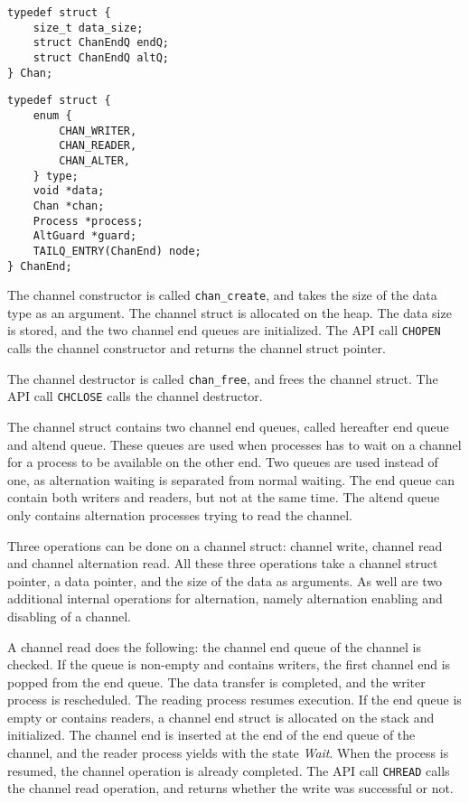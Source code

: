 \noindent\begin{minipage}{.45\textwidth}
\begin{lstlisting}[caption={Channel type struct},style={CustomC},label={lst:channel_type_struct}]
typedef struct {
    size_t data_size;
    struct ChanEndQ endQ;
    struct ChanEndQ altQ;
} Chan;
\end{lstlisting}
\end{minipage}\hfill
\begin{minipage}{.45\textwidth}
\begin{lstlisting}[caption={Channel end type struct},style={CustomC},label={lst:channel_end_type_struct}]
typedef struct {
    enum {
        CHAN_WRITER,
        CHAN_READER,
        CHAN_ALTER,
    } type;
    void *data;
    Chan *chan;
    Process *process;
    AltGuard *guard;
    TAILQ_ENTRY(ChanEnd) node;
} ChanEnd;
\end{lstlisting}
\end{minipage}

The channel constructor is called \texttt{chan\_create}, and takes the size of the data type as an argument. The channel struct is allocated on the heap. The data size is stored, and the two channel end queues are initialized. The API call \texttt{CHOPEN} calls the channel constructor and returns the channel struct pointer. 

The channel destructor is called \texttt{chan\_free}, and frees the channel struct. The API call \texttt{CHCLOSE} calls the channel destructor.

The channel struct contains two channel end queues, called hereafter end queue and altend queue. These queues are used when processes has to wait on a channel for a process to be available on the other end. Two queues are used instead of one, as alternation waiting is separated from normal waiting. The end queue can contain both writers and readers, but not at the same time. The altend queue only contains alternation processes trying to read the channel. 

Three operations can be done on a channel struct: channel write, channel read and channel alternation read. All these three operations take a channel struct pointer, a data pointer, and the size of the data as arguments. As well are two additional internal operations for alternation, namely alternation enabling and disabling of a channel. 

A channel read does the following: the channel end queue of the channel is checked. If the queue is non\hyp{}empty and contains writers, the first channel end is popped from the end queue. The data transfer is completed, and the writer process is rescheduled. The reading process resumes execution. If the end queue is empty or contains readers, a channel end struct is allocated on the stack and initialized. The channel end is inserted at the end of the end queue of the channel, and the reader process yields with the state \textit{Wait}. When the process is resumed, the channel operation is already completed. The API call \texttt{CHREAD} calls the channel read operation, and returns whether the write was successful or not. 

